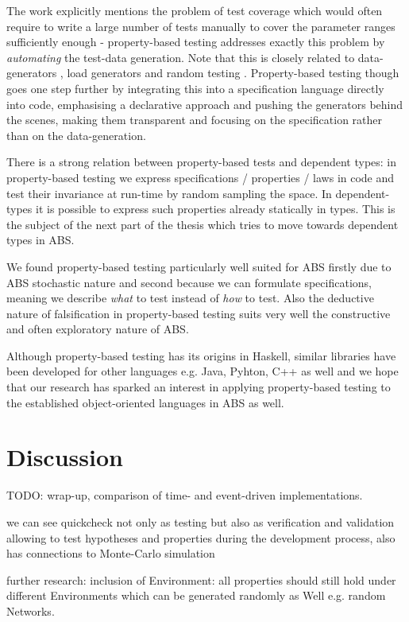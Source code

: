 The work \cite{onggo_test-driven_2016} explicitly mentions the problem of test coverage which would often require to write a large number of tests manually to cover the parameter ranges sufficiently enough - property-based testing addresses exactly this problem by \textit{automating} the test-data generation. Note that this is closely related to data-generators \cite{gurcan_generic_2013}, load generators and random testing \cite{burnstein_practical_2010}. Property-based testing though goes one step further by integrating this into a specification language directly into code, emphasising a declarative approach and pushing the generators behind the scenes, making them transparent and focusing on the specification rather than on the data-generation. 





There is a strong relation between property-based tests and dependent types: in property-based testing we express specifications / properties / laws in code and test their invariance at run-time by random sampling the space. In dependent-types it is possible to express such properties already statically in types. This is the subject of the next part of the thesis which tries to move towards dependent types in ABS.

We found property-based testing particularly well suited for ABS firstly due to ABS stochastic nature and second because we can formulate specifications, meaning we describe \textit{what} to test instead of \textit{how} to test. Also the deductive nature of falsification in property-based testing suits very well the constructive and often exploratory nature of ABS. 

Although property-based testing has its origins in Haskell, similar libraries have been developed for other languages e.g. Java, Pyhton, C++ as well and we hope that our research has sparked an interest in applying property-based testing to the established object-oriented languages in ABS as well.











\chapter*{Discussion}
TODO: wrap-up, comparison of time- and event-driven implementations.

we can see quickcheck not only as testing but also as verification and validation allowing to test hypotheses and properties during the development process, also has connections to Monte-Carlo simulation

further research: inclusion of Environment: all  properties should still hold under different Environments which can be generated randomly as Well e.g. random Networks.